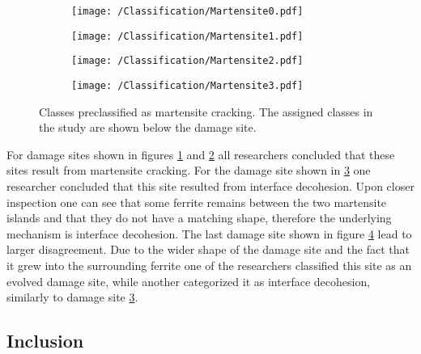 \begin{figure}[H]
\begin{subfigure}{.25\textwidth}
\centering
  \texttt{[image: /Classification/Martensite0.pdf]}
  \caption{}
  \label{fig:MC1}
\end{subfigure}%
\begin{subfigure}{.25\textwidth}
\centering
  \texttt{[image: /Classification/Martensite1.pdf]}
  \caption{}
  \label{fig:MC2}
\end{subfigure}%
\centering
\begin{subfigure}{.25\textwidth}
\centering
  \texttt{[image: /Classification/Martensite2.pdf]}
  \caption{}
  \label{fig:MC3}
\end{subfigure}%
\begin{subfigure}{.25\textwidth}
\centering
  \texttt{[image: /Classification/Martensite3.pdf]}
  \caption{}
  \label{fig:MC4}
\end{subfigure}%
\caption{Classes preclassified as martensite cracking. The assigned classes in the study are shown below the damage site.}
\label{fig:classes}
\end{figure}

For damage sites shown in figures \ref{fig:MC1} and \ref{fig:MC2} all researchers concluded that these sites result from martensite cracking. For the damage site shown in \ref{fig:MC3} one researcher concluded that this site resulted from interface decohesion. Upon closer inspection one can see that some ferrite remains between the two martensite islands and that they do not have a matching shape, therefore the underlying mechanism is interface decohesion. The last damage site shown in figure \ref{fig:MC4} lead to larger disagreement. Due to the wider shape of the damage site and the fact that it grew into the surrounding ferrite one of the researchers classified this site as an evolved damage site, while another categorized it as interface decohesion, similarly to damage site \ref{fig:MC3}. 

\subsection{Inclusion}


